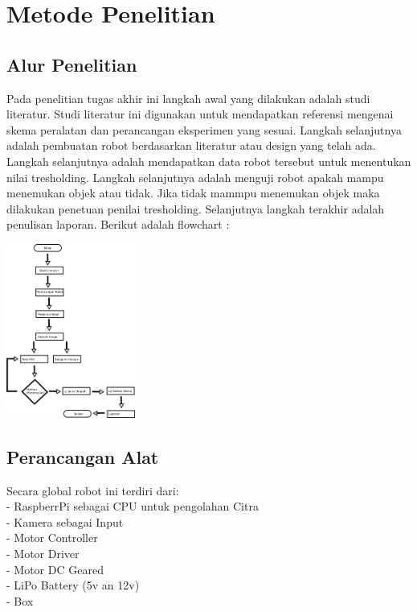 \documentclass[10pt,journal,compsoc]{IEEEtran}
\begin{document}
  \section{Metode Penelitian}
  
  \subsection{Alur Penelitian}
  Pada penelitian tugas akhir ini langkah awal yang dilakukan adalah studi literatur. 
  Studi literatur ini digunakan untuk mendapatkan referensi mengenai skema peralatan dan perancangan eksperimen yang sesuai. 
  Langkah selanjutnya adalah pembuatan robot berdasarkan literatur atau design yang telah ada.
  Langkah selanjutnya adalah mendapatkan data robot tersebut untuk menentukan nilai tresholding. 
  Langkah selanjutnya adalah menguji robot apakah mampu menemukan objek atau tidak.
  Jika tidak mammpu menemukan objek maka dilakukan penetuan penilai tresholding.
  Selanjutnya langkah terakhir adalah penulisan laporan.
  Berikut adalah flowchart :
  \begin{center}
    \includegraphics[width=120pt]{work}\\
  \end{center}
  
  \subsection{Perancangan Alat}
  Secara global robot ini terdiri dari:\\
  - RaspberrPi sebagai CPU untuk pengolahan Citra\\
  - Kamera sebagai Input\\
  - Motor Controller\\
  - Motor Driver\\
  - Motor DC Geared\\
  - LiPo Battery (5v an 12v)\\
  - Box \\
  
\end{document}
